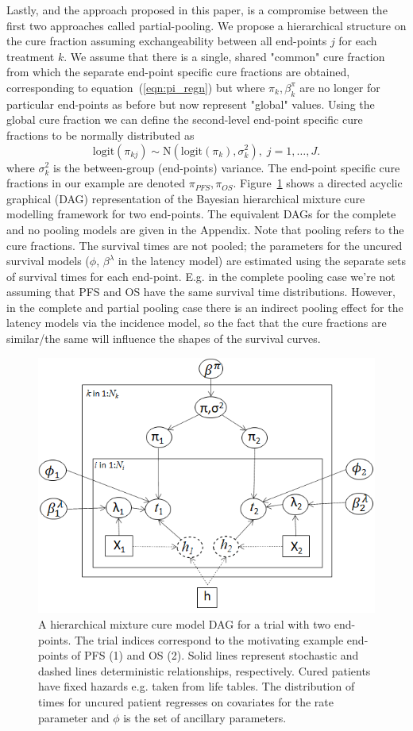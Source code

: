 \documentclass[AMA,STIX1COL]{WileyNJD-v2}
\begin{document}
Lastly, and the approach proposed in this paper, is a compromise between the first two approaches called partial-pooling.
We propose a hierarchical structure on the cure fraction assuming exchangeability between all end-points $j$ for each treatment $k$.
We assume that there is a single, shared "common" cure fraction from which the separate end-point specific cure fractions are obtained, corresponding to equation~(\ref{eqn:pi_regn})
but where $\pi_{k}, \beta^{\pi}_{k}$ are no longer for particular end-points as before but now represent "global" values.
Using the global cure fraction we can define the second-level end-point specific cure fractions to be normally distributed as
$$
\text{logit}(\pi_{kj}) \sim \text{N}(\text{logit}(\pi_k), \sigma_k^2), \; j = 1, \ldots, J.  
$$
where $\sigma_k^2$ is the between-group (end-points) variance.
The end-point specific cure fractions in our example are denoted $\pi_{PFS}, \pi_{OS}$.
Figure~\ref{fig:hier_dag} shows a directed acyclic graphical (DAG) representation of the Bayesian hierarchical mixture cure modelling framework for two end-points.
The equivalent DAGs for the complete and no pooling models are given in the Appendix.
Note that pooling refers to the cure fractions. The survival times are not pooled; the parameters for the uncured survival models ($\phi$, $\beta^{\lambda}$ in the latency model) are estimated using the separate sets of survival times for each end-point.
E.g. in the complete pooling case we're not assuming that PFS and OS have the same survival time distributions.
However, in the complete and partial pooling case there is an indirect pooling effect for the latency models via the incidence model, so the fact that the cure fractions are similar/the same will influence the shapes of the survival curves.

\begin{figure}[!ht]
\centering
\includegraphics[width=0.6\linewidth]{DAG_with_Tx.png}
\caption{\label{fig:hier_dag} A hierarchical mixture cure model DAG for a trial with two end-points. The trial indices correspond to the motivating example end-points of PFS (1) and OS (2).
Solid lines represent stochastic and dashed lines deterministic relationships, respectively.
Cured patients have fixed hazards e.g. taken from life tables.
The distribution of times for uncured patient regresses on covariates for the rate parameter and $\phi$ is the set of ancillary parameters.}
\end{figure}
\end{document}
